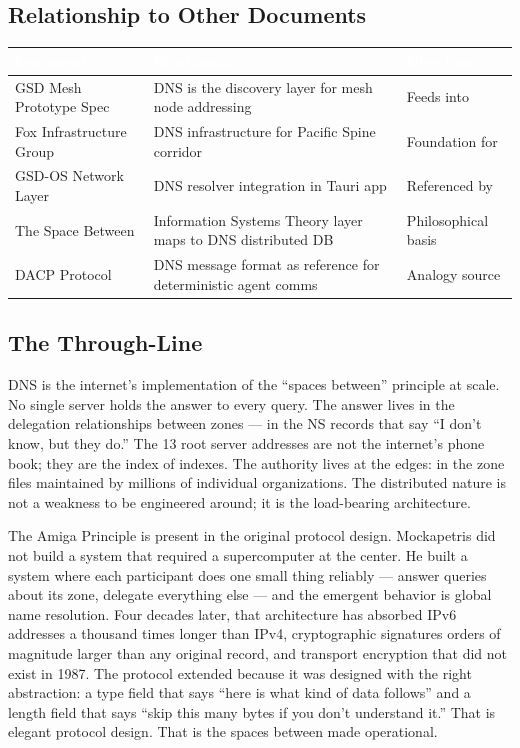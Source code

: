 \documentclass[11pt,letterpaper]{article}
\newcommand{\tableheader}[1]{\textbf{\sffamily\textcolor{white}{#1}}}
\begin{document}
\subsection{Relationship to Other Documents}

\begin{center}
\begin{tabularx}{\textwidth}{L{4cm}XC{2.5cm}}
\toprule
{}
\tableheader{Document} & \tableheader{Relationship} & \tableheader{Direction} \\
\midrule
GSD Mesh Prototype Spec & DNS is the discovery layer for mesh node addressing & Feeds into \\
Fox Infrastructure Group & DNS infrastructure for Pacific Spine corridor & Foundation for \\
GSD-OS Network Layer & DNS resolver integration in Tauri app & Referenced by \\
The Space Between & Information Systems Theory layer maps to DNS distributed DB & Philosophical basis \\
DACP Protocol & DNS message format as reference for deterministic agent comms & Analogy source \\
\bottomrule
\end{tabularx}
\end{center}

\subsection{The Through-Line}

DNS is the internet's implementation of the ``spaces between'' principle at scale. No single server holds the answer to every query. The answer lives in the delegation relationships between zones --- in the NS records that say ``I don't know, but they do.'' The 13 root server addresses are not the internet's phone book; they are the index of indexes. The authority lives at the edges: in the zone files maintained by millions of individual organizations. The distributed nature is not a weakness to be engineered around; it is the load-bearing architecture.

The Amiga Principle is present in the original protocol design. Mockapetris did not build a system that required a supercomputer at the center. He built a system where each participant does one small thing reliably --- answer queries about its zone, delegate everything else --- and the emergent behavior is global name resolution. Four decades later, that architecture has absorbed IPv6 addresses a thousand times longer than IPv4, cryptographic signatures orders of magnitude larger than any original record, and transport encryption that did not exist in 1987. The protocol extended because it was designed with the right abstraction: a type field that says ``here is what kind of data follows'' and a length field that says ``skip this many bytes if you don't understand it.'' That is elegant protocol design. That is the spaces between made operational.
\end{document}
